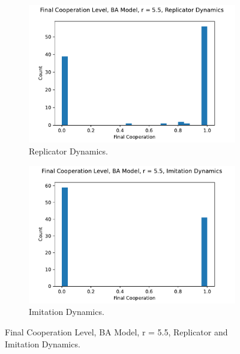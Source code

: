 \FloatBarrier 
\begin{figure}[!h]
  \begin{subfigure}[b]{0.45\textwidth}
    \includegraphics[width=1.1\textwidth]{images/Rep_coop_histo_BA_55.pdf}
    \caption{Replicator Dynamics.}
    \label{Rep_BA_55_coop_histo}
  \end{subfigure}
  \hfill
  \begin{subfigure}[b]{0.45\textwidth}
    \includegraphics[width=1.1\textwidth]{images/ID_coop_histo_BA_55.pdf}
    \caption{Imitation Dynamics. }
    \label{ID_BA_55_coop_histo}
  \end{subfigure}
  \caption{Final Cooperation Level, BA Model, r = 5.5, Replicator and Imitation Dynamics. } \label{coop_histo_BA}
\end{figure} 
\FloatBarrier

